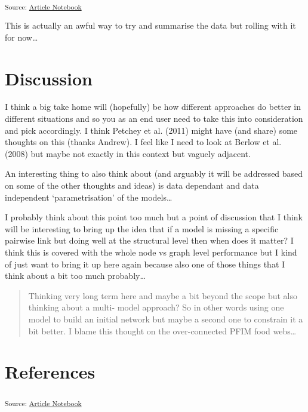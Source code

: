 \documentclass[
]{agujournal2019}
\begin{document}
\textsubscript{Source:
\href{https://BecksLab.github.io/ms_t_is_for_topology/index.qmd.html}{Article
Notebook}}

This is actually an awful way to try and summarise the data but rolling
with it for now\ldots{}

\section{Discussion}\label{discussion}

I think a big take home will (hopefully) be how different approaches do
better in different situations and so you as an end user need to take
this into consideration and pick accordingly. I think Petchey et al.
(2011) might have (and share) some thoughts on this (thanks Andrew). I
feel like I need to look at Berlow et al. (2008) but maybe not exactly
in this context but vaguely adjacent.

An interesting thing to also think about (and arguably it will be
addressed based on some of the other thoughts and ideas) is data
dependant and data independent `parametrisation' of the models\ldots{}

I probably think about this point too much but a point of discussion
that I think will be interesting to bring up the idea that if a model is
missing a specific pairwise link but doing well at the structural level
then when does it matter? I think this is covered with the whole node vs
graph level performance but I kind of just want to bring it up here
again because also one of those things that I think about a bit too much
probably\ldots{}

\begin{quote}
Thinking very long term here and maybe a bit beyond the scope but also
thinking about a multi- model approach? So in other words using one
model to build an initial network but maybe a second one to constrain it
a bit better. I blame this thought on the over-connected PFIM food
webs\ldots{}
\end{quote}

\section*{References}\label{references}

\vspace{1em}

\textsubscript{Source:
\href{https://BecksLab.github.io/ms_t_is_for_topology/index.qmd.html}{Article
Notebook}}
\end{document}
